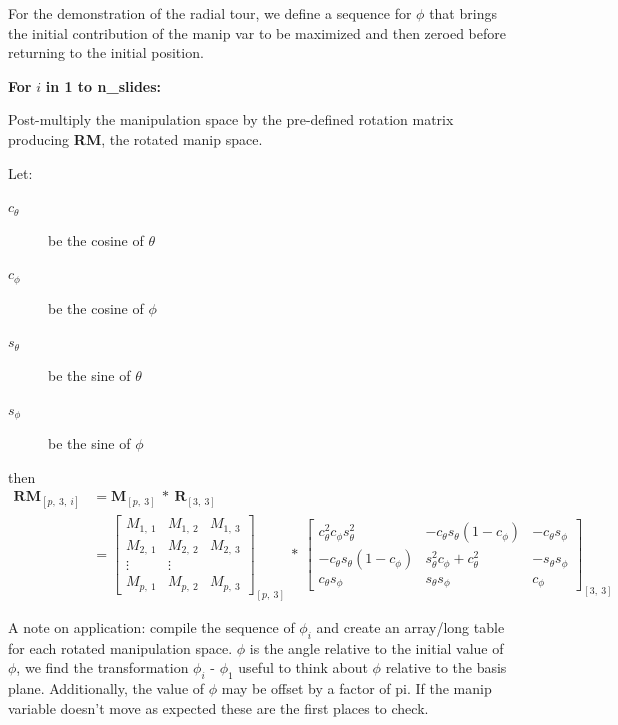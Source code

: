 For the demonstration of the radial tour, we define a sequence for \(\phi\) that brings the initial contribution of the manip var to be maximized and then zeroed before returning to the initial position.

\textbf{For } \(i\) \textbf{in 1 to n\_slides:}

Post-multiply the manipulation space by the pre-defined rotation matrix producing \textbf{RM}, the rotated manip space.

Let:

\begin{description}
  \item[$c_\theta$] be the cosine of $\theta$
  \item[$c_\phi$]   be the cosine of $\phi$
  \item[$s_\theta$] be the sine of   $\theta$
  \item[$s_\phi$]   be the sine of   $\phi$
\end{description}

then
\begin{align*}
  \textbf{RM}_{[p,~3,~i]}
  &= \textbf{M}_{[p,~3]} ~*~ \textbf{R}_{[3,~3]} \\
  &= \begin{bmatrix}
    M_{1,~1} & M_{1,~2} & M_{1,~3} \\
    M_{2,~1} & M_{2,~2} & M_{2,~3} \\
    \vdots   & \vdots   \\
    M_{p,~1} & M_{p,~2} & M_{p,~3}
  \end{bmatrix}_{[p,~3]}
    ~*~
  \begin{bmatrix}
    c_\theta^2 c_\phi s_\theta^2 &
    -c_\theta s_\theta (1 - c_\phi) &
    -c_\theta s_\phi \\
    -c_\theta s_\theta (1 - c_\phi) &
    s_\theta^2 c_\phi + c_\theta^2 &
    -s_\theta s_\phi \\
    c_\theta s_\phi &
    s_\theta s_\phi &
    c_\phi
  \end{bmatrix}_{[3,~3]}
\end{align*}

A note on application: compile the sequence of \(\phi_i\) and create an array/long table for each rotated manipulation space. \(\phi\) is the angle relative to the initial value of \(\phi\), we find the transformation \(\phi_i\) - \(\phi_1\) useful to think about \(\phi\) relative to the basis plane. Additionally, the value of \(\phi\) may be offset by a factor of pi. If the manip variable doesn't move as expected these are the first places to check.

